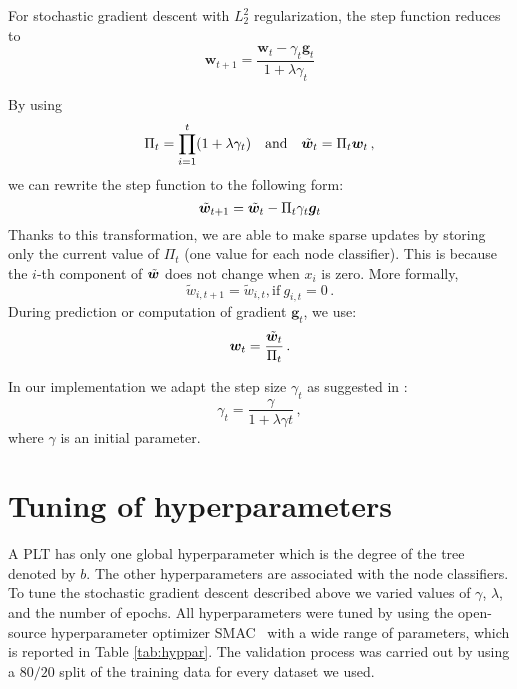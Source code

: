 \documentclass{article}
\newcommand{\Algo}[1]{\textsc{#1}}
\begin{document}
For stochastic gradient descent with $L_2^2$ regularization,
the step function reduces to
\begin{equation*}\label{eq:fobosl2}
	\bm{w}_{t+1} = \frac{\bm{w}_t - \gamma_t \bm{g}_t}{1 + \lambda\gamma_{t}}
\end{equation*}

By using  
$$
\Pi_t = \prod_{i=1}^t (1 + \lambda\gamma_{t}) 
\quad \mathrm{and} \quad \tilde{\boldsymbol{w}}_t = \Pi_{t} \boldsymbol{w}_t \,,
$$
we can rewrite the step function to the following form:
$$
\tilde{\boldsymbol{w}}_{t+1}  = \tilde{\boldsymbol{w}}_t - \Pi_{t}  \gamma_t \bm{g}_t
$$
Thanks to this transformation, we are able to make sparse updates by storing only the current value of $\Pi_t$ (one value for each node classifier). This is because the $i$-th component of $\tilde{\boldsymbol{w}}$ does not change when $x_i$ is zero. More formally, 
$$
\tilde{w}_{i,t+1}  = \tilde{w}_{i,t} \mathrm{, if~} g_{i,t} = 0 \,.
$$
During prediction or computation of gradient $\bm{g}_t$, we use:
$$
\boldsymbol{w}_t = \frac{\tilde{\boldsymbol{w}}_{t}}{\Pi_{t}} \,.
$$

In our implementation we adapt the step size $\gamma_t$ as suggested in \citep{Bottou_2012}:
$$
\gamma_t = \frac{\gamma}{1 + \lambda \gamma t} \,,
$$
where $\gamma$ is an initial parameter.


\section{Tuning of hyperparameters}
\label{sec:hyper}


A \Algo{PLT} has only one global hyperparameter which is the degree of the tree denoted by $b$. The other hyperparameters are associated with the node classifiers. To tune the stochastic gradient descent described above we varied values of $\gamma$, $\lambda$, and the number of epochs. 
%
All hyperparameters were tuned by using the open-source hyperparameter optimizer \Algo{SMAC}~\cite{Hutter_et_al_2011} with a wide range of parameters, which is reported in Table \ref{tab:hyppar}. 
The validation process was carried out by using a $80/20$ split of the training data for every dataset we used.
\end{document}
